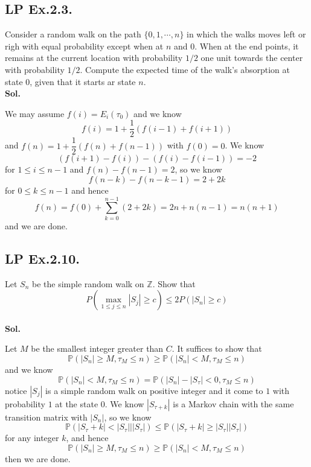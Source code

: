 \documentclass[lang=en,11pt,a4paper,citestyle =authoryear]{elegantpaper}
\newcommand{\Z}{\mathbb{Z}}
\newcommand{\Pb}{\mathbb{P}}
\begin{document}
\subsection*{LP Ex.2.3.} 
Consider a random walk on the path $\{0,1,\cdots,n\}$ in which the walks moves left or righ with equal probability except when at $n$ and $0$. When at the end points, it remains at the current location with probability $1/2$ one unit towards the center with probability $1/2$. Compute the expected time of the walk's absorption at state $0$, given that it starts ar state $n$.
\vspace{0.5em}\\
\textbf{Sol.} \par
We may assume $f(i) = E_i(\tau_{0})$ and we know
\[
f(i) = 1 + \dfrac{1}{2}(f(i-1)+f(i+1))
\]
and $f(n) = 1+\dfrac{1}{2}(f(n)+f(n-1))$ with $f(0) = 0$. We know
\[
(f(i+1)-f(i)) - (f(i)-f(i-1)) = -2
\]
for $1\leq i \leq n-1$ and $f(n)-f(n-1) = 2$, so we know
\[
f(n-k)-f(n-k-1) = 2+2k
\]
for $0\leq k \leq n-1$ and hence
\[
f(n) = f(0) + \sum\limits_{k=0}^{n-1}(2+2k) = 2n + n(n-1) = n(n+1)
\]
and we are done.
\vspace{0.5em}

\subsection*{LP Ex.2.10.} 
Let $S_n$ be the simple random walk on $\Z$. Show that
\[
P(\max_{1\leq j\leq n}|S_j| \geq c) \leq 2P(|S_n| \geq c)
\]
\vspace{0.5em}\\
\textbf{Sol.} \par
Let $M$ be the smallest integer greater than $C$. It suffices to show that 
\[
\Pb(|S_n| \geq M, \tau_M \leq n) \geq \Pb(|S_n| < M, \tau_M \leq n)
\]
and we know
\[
\Pb(|S_n| < M, \tau_M \leq n) = \Pb(|S_n|-|S_\tau|<0, \tau_M \leq n)
\]
notice $|S_j|$ is a simple random walk on positive integer and it come to $1$ with probability $1$ at the state $0$. We know $|S_{\tau+k}|$ is a Markov chain with the same transition matrix with $|S_n|$, so we know
\[
\Pb(|S_\tau+k|<|S_{\tau}|||S_{\tau}|) \leq \Pb(|S_{\tau}+k|\geq |S_{\tau}||S_{\tau}|)
\]
for any integer $k$, and hence
\[
\Pb(|S_n| \geq M, \tau_M \leq n) \geq \Pb(|S_n| < M, \tau_M \leq n)
\]
then we are done.
\vspace{0.5em}


\addappheadtotoc
\end{document}

